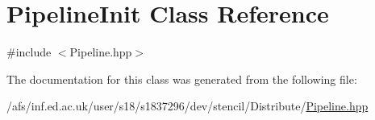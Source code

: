 \hypertarget{classPipelineInit}{\section{Pipeline\-Init Class Reference}
\label{classPipelineInit}
}


{\ttfamily \#include $<$Pipeline.\-hpp$>$}



The documentation for this class was generated from the following file\-:\begin{DoxyCompactItemize}
\item 
/afs/inf.\-ed.\-ac.\-uk/user/s18/s1837296/dev/stencil/\-Distribute/\hyperlink{Pipeline_8hpp}{Pipeline.\-hpp}\end{DoxyCompactItemize}
